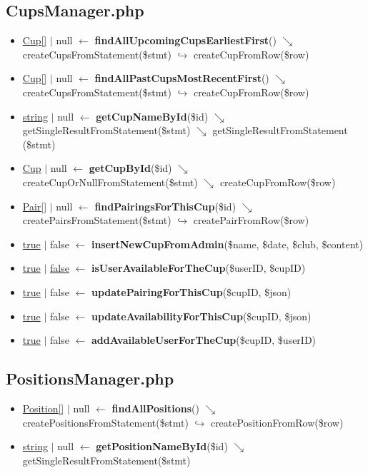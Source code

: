 \subsection{CupsManager.php}
\begin{itemize}
  \setlength\itemsep{0em}
  \item \underline{Cup[]} $\vert$ null $\leftarrow$ \textbf{findAllUpcomingCupsEarliestFirst}() $\searrow$ createCupsFromStatement(\$stmt) $\hookrightarrow$ createCupFromRow(\$row)
  \item \underline{Cup[]} $\vert$ null $\leftarrow$ \textbf{findAllPastCupsMostRecentFirst}() $\searrow$ createCupsFromStatement(\$stmt) $\hookrightarrow$ createCupFromRow(\$row)
  \item \underline{string} $\vert$ null  $\leftarrow$ \textbf{getCupNameById}(\$id) $\searrow$ getSingleResultFromStatement(\$stmt) $\searrow$ getSingleResultFromStatement (\$stmt)
  \item \underline{Cup} $\vert$ null  $\leftarrow$  \textbf{getCupById}(\$id) $\searrow$ createCupOrNullFromStatement(\$stmt)  $\searrow$ createCupFromRow(\$row)
  \item \underline{Pair[]} $\vert$ null $\leftarrow$  \textbf{findPairingsForThisCup}(\$id) $\searrow$ createPairsFromStatement(\$stmt) $\hookrightarrow$ createPairFromRow(\$row)
  \item \underline{true} $\vert$ false $\leftarrow$  \textbf{insertNewCupFromAdmin}(\$name, \$date, \$club, \$content)
  \item \underline{true} $\vert$ \underline{false} $\leftarrow$  \textbf{isUserAvailableForTheCup}(\$userID, \$cupID)
  \item \underline{true} $\vert$ false $\leftarrow$  \textbf{updatePairingForThisCup}(\$cupID, \$json)
  \item \underline{true} $\vert$ false $\leftarrow$  \textbf{updateAvailabilityForThisCup}(\$cupID, \$json)
  \item \underline{true} $\vert$ false $\leftarrow$  \textbf{addAvailableUserForTheCup}(\$cupID, \$userID)
\end{itemize}
\subsection{PositionsManager.php}
\begin{itemize}
  \setlength\itemsep{0em}
  \item \underline{Position[]} $\vert$ null $\leftarrow$  \textbf{findAllPositions}() $\searrow$ createPositionsFromStatement(\$stmt) $\hookrightarrow$ createPositionFromRow(\$row)
  \item \underline{string} $\vert$ null $\leftarrow$ \textbf{getPositionNameById}(\$id) $\searrow$ getSingleResultFromStatement(\$stmt)
\end{itemize}
